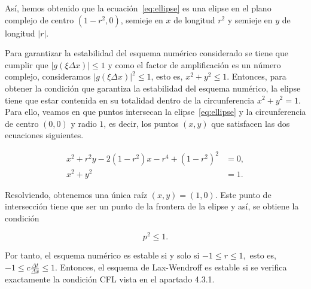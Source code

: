\begin{example}
  Así, hemos obtenido que la ecuación~\eqref{eq:ellipse} es una
  elipse en el plano complejo de centro $\left(1-r^2, 0\right)$,
  semieje en $x$ de longitud $r^{2}$ y semieje en $y$ de longitud
  $\left|r\right|$.

  Para garantizar la estabilidad del esquema numérico considerado se
  tiene que cumplir que
  \begin{math}
    \left|
    g
    \left(
    \xi\Delta x
    \right)
    \right|
    \leq
    1
  \end{math}
  y como el factor de amplificación es un número complejo,
  consideramos
  \begin{math}
    {\left|
      g
      \left(\xi\Delta x\right)
      \right|}^{2}\leq
    1
  \end{math},
  esto es,
  \begin{math}
    x^{2}+
    y^{2}\leq
    1
  \end{math}.
  Entonces, para obtener la condición que garantiza la estabilidad
  del esquema numérico, la elipse tiene que estar contenida en su
  totalidad dentro de la circunferencia $x^{2}+y^{2}=1$.
  Para ello, veamos en que puntos intersecan la
  elipse~\eqref{eq:ellipse} y la circunferencia de centro
  $\left(0,0\right)$ y radio $1$, es decir, los puntos
  $\left(x,y\right)$ que satisfacen las dos ecuaciones siguientes.

  \begin{align*}
    x^{2}+
    r^{2}y-
    2\left(1-r^{2}\right)x-
    r^{4}+
    {\left(1-r^{2}\right)}^{2}
     & =
    0,   \\
    x^{2}+y^{2}
     & =
    1.
  \end{align*}

  Resolviendo, obtenemos una única raíz
  \begin{math}
    \left(x,y\right)=
    \left(1,0\right)
  \end{math}.
  Este punto de intersección tiene que ser un punto de la frontera de
  la elipse y así, se obtiene la condición

  \begin{equation*}
    p^{2}\leq
    1.
  \end{equation*}

  Por tanto, el esquema numérico es estable si y solo si
  \begin{math}
    -1\leq
    r\leq
    1,
  \end{math}
  esto es,
  \begin{math}
    -1\leq
    c\frac{\Delta t}{\Delta x}\leq
    1
  \end{math}.
  Entonces, el esquema de Lax-Wendroff es estable si se verifica
  exactamente la condición CFL vista en el apartado 4.3.1.
\end{example}